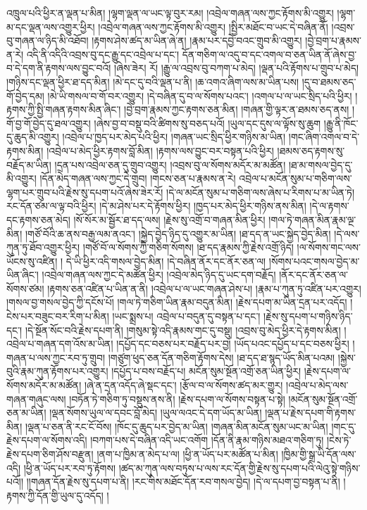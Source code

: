 འཁྲུལ་པའི་ཕྱིར་ན་ལྡན་པ་མིན། །ལྷག་ལྡན་ལ་ཡང་ལྟ་བུར་རམ། །འབྲེལ་གཞན་ལས་ཀྱང་རྟོགས་མི་འགྱུར། །ལྷག་མ་དང་ལྡན་ལས་འགྱུར་ཕྱིར། །འབྲེལ་གཞན་ལས་ཀྱང་རྟོགས་མི་འགྱུར། །སྤྱིར་མཐོང་བ་ཡང་དེ་བཞིན་ནོ། །འབྲས་བུ་གཞན་ལ་ཉིད་མི་འཐོབ། །རྟགས་ཤེས་ཚད་མ་ཡིན་ཞེ་ན། །རྣམ་པར་དབྱེ་བའང་གྲུབ་མི་འགྱུར། །བྱེ་བྲག་པ་རྣམས་ན་རེ། འདི་ནི་འདིའི་འབྲས་བུ་དང་རྒྱུ་དང་འབྲེལ་པ་དང་། དོན་གཅིག་ལ་འདུ་བ་དང་འགལ་བ་ཅན་ཡིན་ནོ་ཞེས་བྱ་བ་དེ་དག་ནི་རྟགས་ལས་བྱུང་བའོ། །ཞེས་ཟེར། རོ། །རྒྱུ་ལ་འབྲས་བུ་བཀག་པ་མེད། །ལྡན་པའི་རྟོགས་པ་གྲུབ་པ་མེད། །གཉིས་དང་ལྡན་ཕྱིར་ཐ་དད་མིན། །མེ་དང་དུ་བའི་ལྡན་པ་ནི། །ཆ་འགའ་ཞིག་ལས་མ་ཡིན་པས། །དུ་བ་ཐམས་ཅད་གོ་བྱེད་དམ། །མེ་ཡི་གསལ་བ་གོ་བར་འགྱུར། །དེ་བཞིན་དུ་བ་ལ་སོགས་པའང་། །འགལ་པ་ལ་ཡང་སྲིད་པའི་ཕྱིར། །རྟགས་ཀྱི་སྤྱི་གཞན་རྟགས་མིན་ཞིང་། །བྱེ་བྲག་རྣམས་ཀྱང་རྟགས་ཅན་མིན། །གཞན་གྱི་ལྟར་ན་ཐམས་ཅད་ནས། །གོ་བྱ་གོ་བྱེད་དུ་ཐལ་འགྱུར། །ཞེས་བྱ་བ་བསྡུ་བའི་ཚིགས་སུ་བཅད་པའོ། །ཡུལ་དང་དུས་ལ་ལྟོས་སུ་ཆུག །རྒྱུ་ནི་ཁོང་དུ་ཆུད་མི་འགྱུར། །འབྲེལ་པ་ཁྱད་པར་མེད་པའི་ཕྱིར། །གཞན་ཡང་སྲིད་ཕྱིར་གཉིས་མ་ཡིན། །གང་ཞིག་འགལ་བ་དེ་རྟགས་མིན། །འབྲེལ་པ་མེད་ཕྱིར་རྟགས་བློ་མིན། །རྟགས་ལས་བྱུང་བར་བསྟན་པའི་ཕྱིར། །ཐམས་ཅད་རྟགས་སུ་བརྗོད་མ་ཡིན། །དྲན་པས་འབྲེལ་ཅན་དུ་གྲུབ་འགྱུར། །འབྲས་བུ་ལ་སོགས་མདོར་མ་མཚོན། །ཐ་མ་གསལ་བྱེད་དུ་མི་འགྱུར། །དོན་མེད་གཞན་ལས་ཀྱང་དེ་གྲུབ། །གངས་ཅན་པ་རྣམས་ན་རེ། འབྲེལ་པ་མངོན་སུམ་པ་གཅིག་ལས་ལྷག་པར་གྲུབ་པའི་རྗེས་སུ་དཔག་པའོ་ཞེས་ཟེར་རོ། །དེ་ལ་མངོན་སུམ་པ་གཅིག་ལས་ཞེས་པ་རིགས་པ་མ་ཡིན་ཏེ། རང་དོན་ཙམ་ལ་ལྟ་བའི་ཕྱིར། །དེ་མ་ཤེས་པར་དེ་རྟོགས་ཕྱིར། །ཁྱད་པར་མེད་ཕྱིར་གཉིས་ནས་མིན། །དེ་ལ་རྟགས་དང་རྟགས་ཅན་མེད། །སོ་སོར་མ་སྦྱོར་ཐ་དད་ལས། །རྗེས་སུ་འགྲོ་བ་གཞན་མིན་ཕྱིར། །གལ་ཏེ་གཞན་མིན་རྣམ་ལྔ་མིན། །གཙོ་བོའི་ཆ་ནས་བརྒྱ་ལམ་ནའང་། །སྐྱེད་བྱེད་ཉིད་དུ་འགྱུར་མ་ཡིན། །ཐ་དད་ན་ཡང་སྐྱེད་བྱེད་མིན། །དེ་ལས་ཀུན་ཏུ་ཐོབ་འགྱུར་ཕྱིར། །གཙོ་བོ་ལ་སོགས་ཀྱི་གཅིག་སོགས། །ཐ་དད་རྣམས་ཀྱི་རྗེས་འགྲོ་ཉིད། །ལ་སོགས་གང་ལས་ཡོངས་སུ་འཛིན། །
དེ་ཡི་ཕྱིར་འདི་གསལ་བྱེད་མིན། །དེ་བཞིན་ནོར་དང་ནོར་ཅན་ལ། །སོགས་པའང་གསལ་བྱེད་མ་ཡིན་ཞིང་། །འབྲེལ་གཞན་ལས་ཀྱང་དེ་མཚོན་ཕྱིར། །འབྲེལ་མེད་ཉིད་དུ་ཡང་དག་བརྗོད། །ནོར་དང་ནོར་ཅན་ལ་སོགས་ཙམ། །རྟགས་ཅན་འཛིན་པ་ཡིན་ན་ནི། །འབྲེལ་པ་ལ་ཡང་གཞན་ཤེས་པ། །རྣམ་པ་ཀུན་ཏུ་འཛིན་པར་འགྱུར། །གསལ་བྱ་གསལ་བྱེད་ཀྱི་དངོས་པོ། །གལ་ཏེ་གཅིག་ཡིན་རྣམ་བདུན་མིན། །རྗེས་དཔག་མ་ཡིན་དྲན་པར་འདོད། །ངེས་པར་བཟུང་བར་རིག་པ་མིན། །ཡང་སྨྲས་པ། འབྲེལ་པ་བདུན་དུ་བསྟན་པ་དང་། །རྗེས་སུ་དཔག་པ་གཉིས་ཉིད་དང་། །དེ་སྔོན་སོང་བའི་རྗེས་དཔག་ནི། །གསུམ་སྟེ་འདི་རྣམས་གང་དུ་བསྡུ། །འབྲས་བུ་མེད་ཕྱིར་དེ་རྟགས་མིན། །འབྲེལ་པ་གཞན་དག་འོས་མ་ཡིན། །དཔྱོད་དང་བཅས་པར་བརྗོད་པར་བྱ། །ཡོད་པའང་དཔྱོད་པ་དང་བཅས་ཕྱིར། །གཞན་པ་ལས་ཀྱང་རབ་ཏུ་གྲུབ། །གཙུག་ཕུད་ཅན་དོན་གཅིག་རྟོགས་དེས། །ཐ་དད་ཐ་སྙད་ཡོད་མིན་པའམ། །སྐྱེས་བུའི་རྣམ་ཀུན་རྟོགས་པར་འགྱུར། །དཔྱོད་པ་བས་བརྗོད་པ། མངོན་སུམ་སྔོན་འགྲོ་ཅན་ཡིན་ཕྱིར། །རྗེས་དཔག་ལ་སོགས་མདོར་མ་མཚོན། །ཞེ་ན་དྲན་འདོད་ཞེ་སྡང་དང་། །རྩོལ་བ་ལ་སོགས་ཚད་མར་གྱུར། །འབྲེལ་པ་མེད་ལས་གཞན་གཞུང་ལས། །བཏོན་ཏེ་གཅིག་ཏུ་བསྡུས་ནས་ནི། །རྗེས་དཔག་ལ་སོགས་བསྟན་པ་སྟེ། །མངོན་སུམ་སྔོན་འགྲོ་ཅན་མ་ཡིན། །ལྡན་སོགས་ཡུལ་ལ་དབང་བློ་མེད། །ཡུལ་ལའང་དེ་དག་ཡོད་མ་ཡིན། །ལྡན་པ་རྗེས་དཔག་གི་རྟགས་མིན། །ལྡན་པ་ཅན་ནི་རང་ངོ་བོས། །ཁོང་དུ་ཆུད་པར་བྱེད་མ་ཡིན། །གཞན་མིན་མངོན་སུམ་ཡང་མ་ཡིན། །གང་དུ་རྗེས་དཔག་ལ་སོགས་འདི། །བཀག་པས་དེ་བཞིན་འདི་ཡང་འགོག །དོན་ནི་རྣམ་གཉིས་མཐའ་གཅིག་ཏུ། །ངེས་ཏེ་རྗེས་དཔག་ཅིག་ཤོས་བརྫུན། །ནག་པ་ཁྱིམ་ན་མེད་པ་ལ། །ཕྱི་ན་ཡོད་པར་མཚོན་པ་མིན། །ཁྱིམ་གྱི་སྒྲ་ཡི་དོན་ལས་འདི། །ཕྱི་ན་ཡོད་པར་རབ་ཏུ་རྟོགས། །ཚད་མ་ཀུན་ལས་བཏུས་པ་ལས་རང་དོན་གྱི་རྗེས་སུ་དཔག་པའི་ལེའུ་སྟེ་གཉིས་པའོ།། །།གཞན་དོན་རྗེས་སུ་དཔག་པ་ནི། །རང་གིས་མཐོང་དོན་རབ་གསལ་བྱེད། །དེ་ལ་དཔག་བྱ་བསྟན་པ་ནི། །རྟགས་ཀྱི་དོན་གྱི་ཡུལ་དུ་འདོད། །
